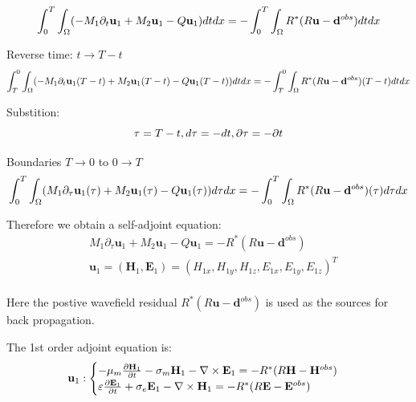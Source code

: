 \documentclass[pdftex,a4paper,parskip,listof=totoc,bibliography=totoc,onehalfspacing,12pt]{scrreprt}
\begin{document}
\begin{equation}
 \int_0^T \int_\Omega (-M_1 \partial_{t} \mathbf{u}_{1}  + M_2 \mathbf{u}_{1} - Q \mathbf{u}_{1})  dt dx = -\int_0^T \int_\Omega R^{*}(R\mathbf{u} - \mathbf{d}^{obs}) dt dx\\
\end{equation}
\par Reverse time: $t \to T-t$
\begin{equation}
 \int_T^0 \int_\Omega (-M_1 \partial_{t} \mathbf{u}_{1}(T-t)  + M_2 \mathbf{u}_{1}(T-t) - Q \mathbf{u}_{1}(T-t) )  dt dx = -\int_T^0 \int_\Omega R^{*}(R\mathbf{u} - \mathbf{d}^{obs})(T-t) dt dx\\
\end{equation}
\par Substition: 
\begin{equation}
 \tau = T - t, d\tau = -dt, \partial \tau = -\partial t\\
\end{equation}
\par Boundaries $T \to 0$ to $0 \to T$
\begin{equation}
 \int_0^T \int_\Omega (M_1 \partial_{\tau} \mathbf{u}_{1}(\tau) + M_2 \mathbf{u}_{1}(\tau) - Q \mathbf{u}_{1}(\tau) )  d\tau dx = -\int_0^T \int_\Omega R^{*}(R\mathbf{u} - \mathbf{d}^{obs})(\tau) d\tau dx\\
\end{equation}
\par Therefore we obtain a self-adjoint equation:
\begin{equation}
\begin{aligned}
\label{eqn:AdjointEquation1}
& M_1 \partial_{\tau} \mathbf{u}_{1} + M_2 \mathbf{u}_{1} - Q \mathbf{u}_{1} =  - R^{*}(R\mathbf{u} - \mathbf{d}^{obs})  \\
& \mathbf{u}_{1} = ( \mathbf{H}_{1}, \mathbf{E}_{1}) = (H_{1x}, H_{1y}, H_{1z}, E_{1x}, E_{1y}, E_{1z})^T  \\ 
\end{aligned}
\end{equation}
\par Here the postive wavefield residual $R^{*}(R\mathbf{u} - \mathbf{d}^{obs}) $ is used as the sources for back propagation. \\
\par The 1st order adjoint equation is:
\begin{equation}
\label{eqn:AdjointEquation11}
\mathbf{u}_{1}:
\begin{cases}
-\mu_{m} \pdv{\mathbf{H}_{1}}{t} - \sigma_{m}\mathbf{H}_{1} - \nabla \times\mathbf{E}_{1} =  -R^{*}(R\mathbf{H} - \mathbf{H}^{obs}) \\
\varepsilon\pdv{\mathbf{E}_{1}}{t} + \sigma_{e}\mathbf{E}_{1} -\nabla \times \mathbf{H}_{1} =  - R^{*}(R\mathbf{E} - \mathbf{E}^{obs})
\end{cases}
\end{equation}
\end{document}
